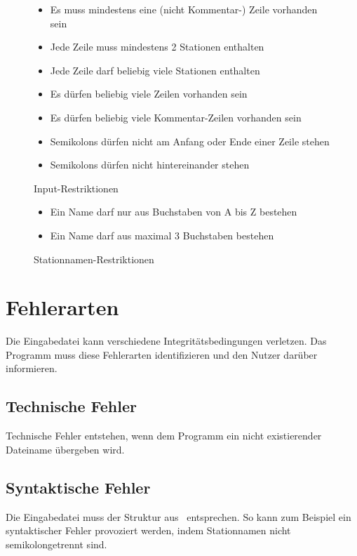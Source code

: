 \begin{figure}[h]
    \centering
    \caption{Input-Restriktionen}
    \begin{itemize}[noitemsep]
        \item Es muss mindestens eine (nicht Kommentar-) Zeile vorhanden sein
        \item Jede Zeile muss mindestens 2 Stationen enthalten
        \item Jede Zeile darf beliebig viele Stationen enthalten
        \item Es dürfen beliebig viele Zeilen vorhanden sein
        \item Es dürfen beliebig viele Kommentar-Zeilen vorhanden sein
        \item Semikolons dürfen nicht am Anfang oder Ende einer Zeile stehen
        \item Semikolons dürfen nicht hintereinander stehen
    \end{itemize}
    \label{fig:input-restrictions}
\end{figure}

\begin{figure}[h]
    \centering
    \caption{Stationnamen-Restriktionen}
    \begin{itemize}[noitemsep]
        \item Ein Name darf nur aus Buchstaben von A bis Z bestehen
        \item Ein Name darf aus maximal 3 Buchstaben bestehen
    \end{itemize}
    \label{fig:stationname-restrictions}
\end{figure}


\section{Fehlerarten}\label{sec:fehlerarten}
Die Eingabedatei kann verschiedene Integritätsbedingungen verletzen.
Das Programm muss diese Fehlerarten identifizieren und den Nutzer darüber informieren.

\subsection{Technische Fehler}\label{subsec:technische-fehler}
Technische Fehler entstehen, wenn dem Programm ein nicht existierender Dateiname übergeben wird.

\subsection{Syntaktische Fehler}\label{subsec:syntaktische-fehler}
Die Eingabedatei muss der Struktur aus~ entsprechen.
So kann zum Beispiel ein syntaktischer Fehler provoziert werden, indem Stationnamen nicht semikolongetrennt sind.

